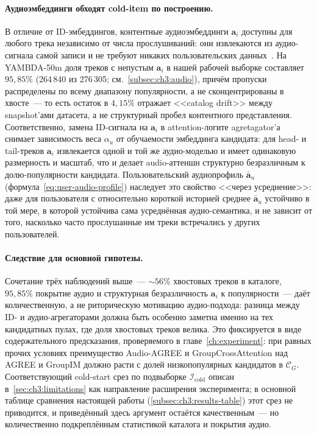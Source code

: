\paragraph{Аудиоэмбеддинги обходят cold-item по построению.} В отличие от ID-эмбеддингов, контентные аудиоэмбеддинги $\mathbf{a}_i$ доступны для любого трека независимо от числа прослушиваний: они извлекаются из аудио-сигнала самой записи и не требуют никаких пользовательских данных~\cite{vandeoord2013deep_music, schedl2018current}. На YAMBDA-50m доля треков с непустым $\mathbf{a}_i$ в нашей рабочей выборке составляет $95{,}85\%$ (264\,840 из 276\,305; см.~\ref{subsec:ch3:audio}), причём пропуски распределены по всему диапазону популярности, а не сконцентрированы в хвосте~--- то есть остаток в $4{,}15\%$ отражает <<catalog drift>> между snapshot'ами датасета, а не структурный пробел контентного представления. Соответственно, замена ID-сигнала на $\mathbf{a}_i$ в attention-логите agretagator'а снимает зависимость веса $\alpha_u$ от обучаемости эмбеддинга кандидата: для head- и tail-треков $\mathbf{a}_i$ извлекается одной и той же аудио-моделью и имеет одинаковую размерность и масштаб, что и делает audio-аттеншн структурно безразличным к долю-популярности кандидата. Пользовательский аудиопрофиль $\bar{\mathbf{a}}_u$ (формула~\eqref{eq:user-audio-profile}) наследует это свойство <<через усреднение>>: даже для пользователя с относительно короткой историей среднее $\bar{\mathbf{a}}_u$ устойчиво в той мере, в которой устойчива сама усреднённая аудио-семантика, и не зависит от того, насколько часто прослушанные им треки встречались у других пользователей.

\paragraph{Следствие для основной гипотезы.} Сочетание трёх наблюдений выше~--- $\sim\!56\%$ хвостовых треков в каталоге, $95{,}85\%$ покрытие аудио и структурная безразличность $\mathbf{a}_i$ к популярности~--- даёт количественную, а не риторическую мотивацию аудио-подхода: разница между ID- и аудио-агрегаторами должна быть особенно заметна именно на тех кандидатных пулах, где доля хвостовых треков велика. Это фиксируется в виде содержательного предсказания, проверяемого в главе~\ref{ch:experiment}: при равных прочих условиях преимущество Audio-AGREE и GroupCrossAttention над AGREE и GroupIM должно расти с долей низкопопулярных кандидатов в $\mathcal{C}_G$. Соответствующий cold-start срез по подвыборке $\mathcal{I}_{\mathrm{cold}}$ описан в~\ref{sec:ch3:limitations} как направление расширения эксперимента; в основной таблице сравнения настоящей работы (\ref{subsec:ch3:results-table}) этот срез не приводится, и приведённый здесь аргумент остаётся качественным~--- но количественно подкреплённым статистикой каталога и покрытия аудио.


